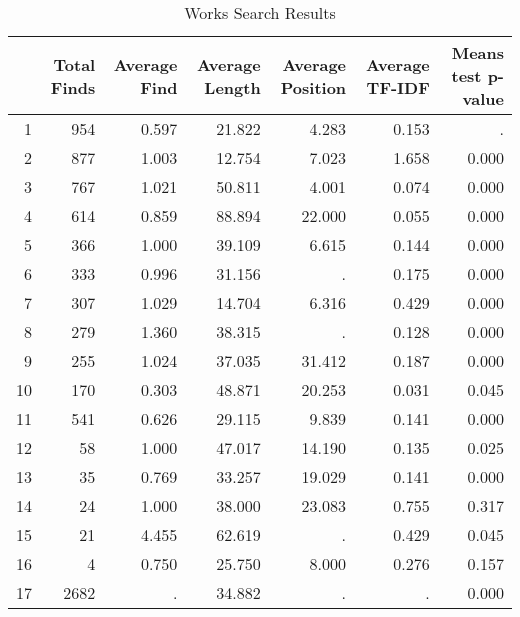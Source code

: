 \begin{table}[!htbp]
\centering
\caption{Works Search Results} 
\label{taba3}
\begin{tabular}{rrrrrrr}
  \hline
 & Total Finds & Average Find & Average Length & Average Position & Average TF-IDF & Means test p-value \\ 
  \hline
1 & 954 & 0.597 & 21.822 & 4.283 & 0.153 & . \\ 
  2 & 877 & 1.003 & 12.754 & 7.023 & 1.658 & 0.000 \\ 
  3 & 767 & 1.021 & 50.811 & 4.001 & 0.074 & 0.000 \\ 
  4 & 614 & 0.859 & 88.894 & 22.000 & 0.055 & 0.000 \\ 
  5 & 366 & 1.000 & 39.109 & 6.615 & 0.144 & 0.000 \\ 
  6 & 333 & 0.996 & 31.156 & . & 0.175 & 0.000 \\ 
  7 & 307 & 1.029 & 14.704 & 6.316 & 0.429 & 0.000 \\ 
  8 & 279 & 1.360 & 38.315 & . & 0.128 & 0.000 \\ 
  9 & 255 & 1.024 & 37.035 & 31.412 & 0.187 & 0.000 \\ 
  10 & 170 & 0.303 & 48.871 & 20.253 & 0.031 & 0.045 \\ 
  11 & 541 & 0.626 & 29.115 & 9.839 & 0.141 & 0.000 \\ 
  12 & 58 & 1.000 & 47.017 & 14.190 & 0.135 & 0.025 \\ 
  13 & 35 & 0.769 & 33.257 & 19.029 & 0.141 & 0.000 \\ 
  14 & 24 & 1.000 & 38.000 & 23.083 & 0.755 & 0.317 \\ 
  15 & 21 & 4.455 & 62.619 & . & 0.429 & 0.045 \\ 
  16 & 4 & 0.750 & 25.750 & 8.000 & 0.276 & 0.157 \\ 
  17 & 2682 & . & 34.882 & . & . & 0.000 \\ 
   \hline
\end{tabular}
\end{table}
